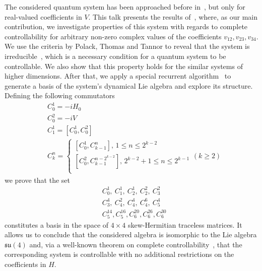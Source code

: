 \documentclass[12pt]{llncs}
\begin{document}
The considered quantum system has been approached before in~\cite{nnSchirmer}, but only for real-valued coefficients in $ V $. This talk presents the results of~\cite{nnKuznetsov}, where, as our main contribution, we investigate properties of this system with regards to complete controllability for arbitrary non-zero complex values of the coefficients $v_{12}, v_{23}, v_{34}$. We use the criteria by Polack, Thomas and Tannor to reveal that the system is irreducible~\cite{Polack}, which is a necessary condition for a quantum system to be controllable. We also show that this property holds for the similar systems of higher dimensions. After that, we apply a special recurrent algorithm~\cite{nnAlessandro} to generate a basis of the system's dynamical Lie algebra and explore its structure. Defining the following commutators
\begin{equation}
    \begin{split}
        & C_{0}^{1} = - i H_{0} \\
        & C_{0}^{2} = - i V \\
        & C_{1}^{1} = \left[C_{0}^{1}, C_{0}^{2}\right] \\
        & C_{k}^{n} = \begin{cases}
            \displaystyle \left[ C_{0}^{1}, C_{k-1}^{n} \right], \, 1 \leqslant n \leqslant 2^{k-2} \\
            \displaystyle \left[ C_{0}^{2}, C_{k-1}^{n - 2^{k-2}} \right], \, 2^{k-2}+1 \leqslant n \leqslant 2^{k-1} \\
        \end{cases} (k \geqslant 2)
    \end{split}
\end{equation}
we prove that the set 
\begin{equation}
    \begin{split}
        & C_{0}^{1}, \  C_{1}^{1}, \  C_{2}^{1}, \ C_{2}^{2}, \ C_{3}^{2} \\
        & C_{3}^{4}, \  C_{4}^{2}, \  C_{4}^{4}, \ C_{4}^{6}, \ C_{5}^{4} \\
        & C_{5}^{14}, C_{5}^{16}, C_{6}^{20}, C_{6}^{26}, C_{6}^{30}
    \end{split}
\end{equation}
constitutes a basis in the space of $ 4 \times 4 $ skew-Hermitian traceless matrices. It allows us to conclude that the considered algebra is isomorphic to the Lie algebra $\mathfrak{su}(4) $ and, via a well-known theorem on complete controllability~\cite{nnAlbertini}, that the corresponding system is controllable with no additional restrictions on the coefficients in $ H $. 
\end{document}

